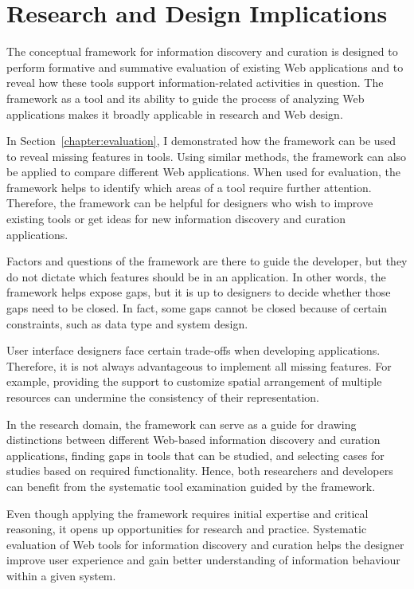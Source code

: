 \documentclass{sigchi}
\begin{document}
{{} %
\section{Research and Design Implications}
The conceptual framework for information discovery and curation is designed to perform formative and summative evaluation of existing Web applications and to reveal how these tools support information-related activities in question. The framework as a tool and its ability to guide the process of analyzing Web applications makes it broadly applicable in research and Web design. 

In Section~\ref{chapter:evaluation}, I demonstrated how the framework can be used to reveal missing features in tools. Using similar methods, the framework can also be applied to compare different Web applications. When used for evaluation, the framework helps to identify which areas of a tool require further attention. Therefore, the framework can be helpful for designers who wish to improve existing tools or get ideas for new information discovery and curation applications. 

Factors and questions of the framework are there to guide the developer, but they do not dictate which features should be in an application. In other words, the framework helps expose gaps, but it is up to designers to decide whether those gaps need to be closed. In fact, some gaps cannot be closed because of certain constraints, such as data type and system design.

User interface designers face certain trade-offs when developing applications. Therefore, it is not always advantageous to implement all missing features. For example, providing the support to customize spatial arrangement of multiple resources can undermine the consistency of their representation. 

In the research domain, the framework can serve as a guide for drawing distinctions between different Web-based information discovery and curation applications, finding gaps in tools that can be studied, and selecting cases for studies based on required functionality. Hence, both researchers and developers can benefit from the systematic tool examination guided by the framework.

Even though applying the framework requires initial expertise and critical reasoning, it opens up opportunities for research and practice. Systematic evaluation of Web tools for information discovery and curation helps the designer improve user experience and gain better understanding of information behaviour within a given system. 

}
\end{document}
